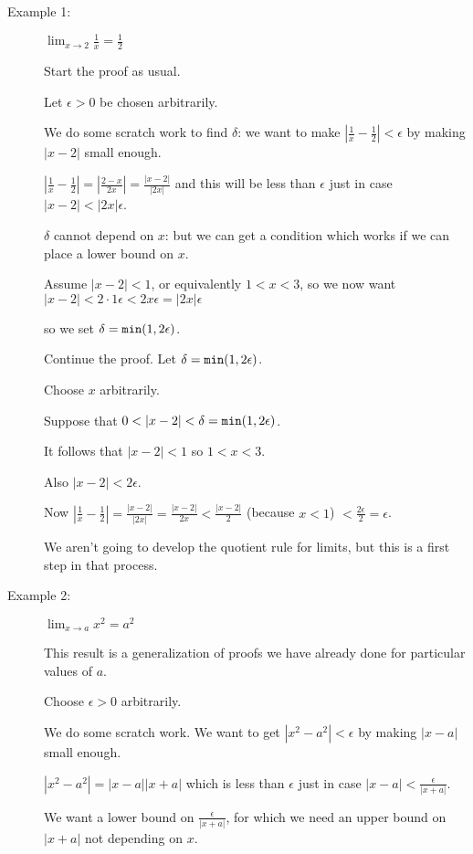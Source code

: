 \documentclass[12pt]{article}
\begin{document}
\begin{description}


\item[Example 1:]  $\lim_{x \rightarrow 2}\frac1x = \frac12$

Start the proof as usual.

Let $\epsilon>0$ be chosen arbitrarily.

We do some scratch work to find $\delta$:  we want to make $|\frac 1x - \frac 12|<\epsilon$ by making $|x-2|$ small enough.

$|\frac 1x - \frac 12| = |\frac{2-x}{2x}| = \frac{|x-2|}{|2x|}$ and this will be less than $\epsilon$ just in case $|x-2|<|2x|\epsilon$.

$\delta$ cannot depend on $x$:  but we can get a condition which works if we can place a lower bound on $x$.

Assume $|x-2|<1$, or equivalently $1<x<3$, so we now want $|x-2|<2\cdot 1\epsilon < 2x\epsilon = |2x|\epsilon$

so we set $\delta = {\tt min}(1,2\epsilon)$.

Continue the proof.  Let $\delta={\tt min}(1,2\epsilon)$.

Choose $x$ arbitrarily.

Suppose that $0<|x-2|<\delta={\tt min}(1,2\epsilon)$.

It follows that $|x-2|<1$ so $1<x<3$.

Also $|x-2|<2\epsilon$.

Now $|\frac 1x - \frac 12| = \frac{|x-2|}{|2x|} = \frac{|x-2|}{2x}<\frac{|x-2|}{2}$ (because $x<1$) $<\frac{2\epsilon}2=\epsilon$.

We aren't going to develop the quotient rule for limits, but this is a first step in that process.

\item[Example 2:]  $\lim_{x \rightarrow a}x^2 = a^2$

This result is a generalization of proofs we have already done for particular values of $a$.

Choose $\epsilon>0$ arbitrarily.

We do some scratch work.  We want to get $|x^2-a^2|<\epsilon$ by making $|x-a|$ small enough.

$|x^2-a^2| = |x-a||x+a|$ which is less than $\epsilon$ just in case $|x-a| < \frac \epsilon{|x+a|}$.

We want a lower bound on $\frac \epsilon{|x+a|}$, for which we need an upper bound on $|x+a|$ not depending on $x$.


\end{description}
\end{document}
